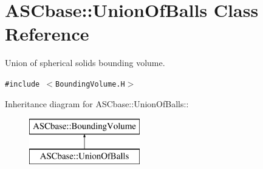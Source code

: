\section{ASCbase::Union\-Of\-Balls Class Reference}
\label{classASCbase_1_1UnionOfBalls}
Union of spherical solids bounding volume.  


{\tt \#include $<$Bounding\-Volume.H$>$}

Inheritance diagram for ASCbase::Union\-Of\-Balls::\begin{figure}[H]
\begin{center}
\leavevmode
\includegraphics[height=2cm]{classASCbase_1_1UnionOfBalls}
\end{center}
\end{figure}
